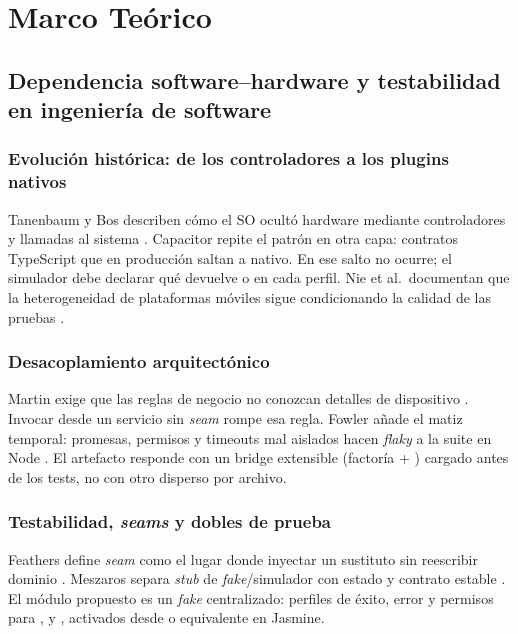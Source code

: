 \section{Marco Teórico}
\label{chap:marco_teorico}

\subsection{Dependencia software--hardware y testabilidad en ingeniería de software}
\label{sec:dependencia_testabilidad}

\subsubsection{Evolución histórica: de los controladores a los plugins nativos}
Tanenbaum y Bos describen cómo el SO ocultó hardware mediante controladores y llamadas al sistema \cite{tanenbaum2015modern_os}. Capacitor repite el patrón en otra capa: contratos TypeScript que en producción saltan a nativo. En  ese salto no ocurre; el simulador debe declarar qué devuelve  o  en cada perfil. Nie et al.\ documentan que la heterogeneidad de plataformas móviles sigue condicionando la calidad de las pruebas \cite{nie2023gui_mobile_mapping}.

\subsubsection{Desacoplamiento arquitectónico}
Martin exige que las reglas de negocio no conozcan detalles de dispositivo \cite{martin2017clean}. Invocar  desde un servicio sin \textit{seam} rompe esa regla. Fowler añade el matiz temporal: promesas, permisos y timeouts mal aislados hacen \textit{flaky} a la suite en Node \cite{fowler2002poeaa}. El artefacto responde con un bridge extensible (factoría + ) cargado antes de los tests, no con otro  disperso por archivo.

\subsubsection{Testabilidad, \textit{seams} y dobles de prueba}
Feathers define \textit{seam} como el lugar donde inyectar un sustituto sin reescribir dominio \cite{feathers2004working}. Meszaros separa \textit{stub} de \textit{fake}/simulador con estado y contrato estable \cite{meszaros2007xunit}. El módulo propuesto es un \textit{fake} centralizado: perfiles de éxito, error y permisos para ,  y , activados desde  o equivalente en Jasmine.

